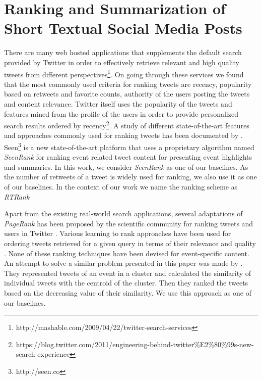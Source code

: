 \section{Ranking and Summarization of Short Textual Social Media Posts}
There are many web hosted applications that supplements the default search provided by Twitter in order to effectively retrieve relevant and high quality tweets from different perspectives\footnote{\tiny http://mashable.com/2009/04/22/twitter-search-services}. On going through these services we found that the most commonly used criteria for ranking tweets are recency, popularity based on retweets and favorite counts, authority of the users posting the tweets and content relevance. Twitter itself uses the popularity of the tweets and features mined from the profile of the users in order to provide personalized search results ordered by recency\footnote{\tiny https://blog.twitter.com/2011/engineering-behind-twitter\%E2\%80\%99s-new-search-experience}. A study of different state-of-the-art features and approaches commonly used for ranking tweets has been documented by \cite{damak2013effectiveness, nagmoti2010ranking}. Seen\footnote{\tiny http://seen.co} is a new state-of-the-art platform that uses a proprietary algorithm named \textit{SeenRank} for ranking event related tweet content for presenting event highlights and summaries. In this work, we consider \textit{SeenRank} as one of our baselines. As the number of retweets of a tweet is widely used for ranking, we also use it as one of our baselines. In the context of our work we name the ranking scheme as \textit{RTRank}

Apart from the existing real-world search applications, several adaptations of \textit{PageRank} \cite{page1999pagerank} has been proposed by the scientific community for ranking tweets and users in Twitter \cite{weng2010twitterrank,tunkelang2009twitter, hallberg2012adaptation}. 
Various learning to rank approaches have been used for ordering tweets retrieved for a given query in terms of their relevance and quality \cite{duan2010empirical,mccreadie2013relevance,vosecky2012searching}. None of these ranking techniques have been devised for event-specific content. An attempt to solve a similar problem presented in this paper was made by \cite{becker2011selecting}. They represented tweets of an event in a cluster and calculated the similarity of individual tweets with the centroid of the cluster. Then they ranked the tweets based on the decreasing value of their similarity. We use this approach as one of our baselines.

